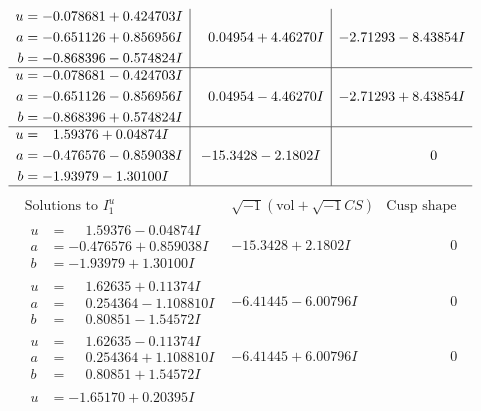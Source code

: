 \documentclass[1p]{elsarticle_modified}
\theoremstyle{definition}
\newcommand{\I}{\sqrt{-1}}
\begin{document}
$$\begin{array}{c|c|c}
\begin{aligned}
u &= -0.078681 + 0.424703 I \\
a &= -0.651126 + 0.856956 I \\
b &= -0.868396 - 0.574824 I\end{aligned}
 & \phantom{-}0.04954 + 4.46270 I & -2.71293 - 8.43854 I \\ \hline\begin{aligned}
u &= -0.078681 - 0.424703 I \\
a &= -0.651126 - 0.856956 I \\
b &= -0.868396 + 0.574824 I\end{aligned}
 & \phantom{-}0.04954 - 4.46270 I & -2.71293 + 8.43854 I \\ \hline\begin{aligned}
u &= \phantom{-}1.59376 + 0.04874 I \\
a &= -0.476576 - 0.859038 I \\
b &= -1.93979 - 1.30100 I\end{aligned}
 & -15.3428 - 2.1802 I & \phantom{-0.000000 } 0\\
 \hline 
 \end{array}$$\newpage$$\begin{array}{c|c|c}  
\text{Solutions to }I^u_{1}& \I (\text{vol} + \sqrt{-1}CS) & \text{Cusp shape}\\
 \hline 
\begin{aligned}
u &= \phantom{-}1.59376 - 0.04874 I \\
a &= -0.476576 + 0.859038 I \\
b &= -1.93979 + 1.30100 I\end{aligned}
 & -15.3428 + 2.1802 I & \phantom{-0.000000 } 0 \\ \hline\begin{aligned}
u &= \phantom{-}1.62635 + 0.11374 I \\
a &= \phantom{-}0.254364 - 1.108810 I \\
b &= \phantom{-}0.80851 - 1.54572 I\end{aligned}
 & -6.41445 - 6.00796 I & \phantom{-0.000000 } 0 \\ \hline\begin{aligned}
u &= \phantom{-}1.62635 - 0.11374 I \\
a &= \phantom{-}0.254364 + 1.108810 I \\
b &= \phantom{-}0.80851 + 1.54572 I\end{aligned}
 & -6.41445 + 6.00796 I & \phantom{-0.000000 } 0 \\ \hline\begin{aligned}
u &= -1.65170 + 0.20395 I \\

\end{aligned}
\end{array}$$
\end{document}
